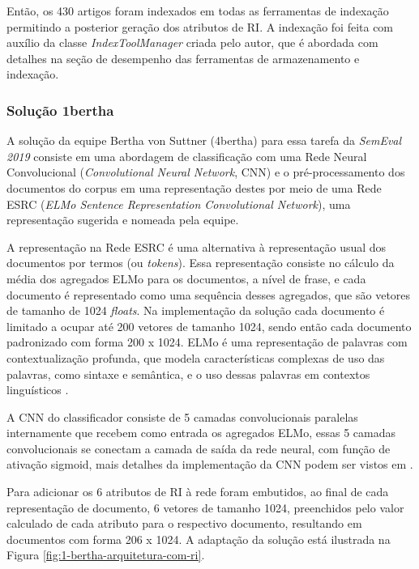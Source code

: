 			Então, os 430 artigos foram indexados em todas as ferramentas de indexação permitindo a posterior geração dos atributos de RI.
			A indexação foi feita com auxílio da classe \textit{IndexToolManager} criada pelo autor, que é abordada com detalhes na seção de desempenho das ferramentas de armazenamento e indexação.
			
			\subsubsection{Solução 1\underscore{}bertha}
				A solução da equipe Bertha von Suttner (4\underscore{}bertha) para essa tarefa da \textit{SemEval 2019} consiste em uma abordagem de classificação com uma Rede Neural Convolucional (\textit{Convolutional Neural Network}, CNN) e o pré-processamento dos documentos do corpus em uma representação destes por meio de uma Rede ESRC (\textit{ELMo Sentence Representation Convolutional Network}), uma representação sugerida e nomeada pela equipe.

				A representação na Rede ESRC é uma alternativa à representação usual dos documentos por termos (ou \textit{tokens}).
				Essa representação consiste no cálculo da média dos agregados ELMo para os documentos, a nível de frase, e cada documento é representado como uma sequência desses agregados, que são vetores de tamanho de 1024 \textit{floats}. 
				Na implementação da solução cada documento é limitado a ocupar até 200 vetores de tamanho 1024, sendo então cada documento padronizado com forma 200 x 1024.
				ELMo é uma representação de palavras com contextualização profunda, que modela características complexas de uso das palavras, como sintaxe e semântica, e o uso dessas palavras em contextos linguísticos \cite{ELMoDBLP:journals/corr/abs-1802-05365}.

				A CNN do classificador consiste de 5 camadas convolucionais paralelas internamente que recebem como entrada os agregados ELMo, essas 5 camadas convolucionais se conectam a camada de saída da rede neural, com função de ativação sigmoid, mais detalhes da implementação da CNN podem ser vistos em .

				Para adicionar os 6 atributos de RI à rede foram embutidos, ao final de cada representação de documento, 6 vetores de tamanho 1024, preenchidos pelo valor calculado de cada atributo para o respectivo documento, resultando em documentos com forma 206 x 1024.
				A adaptação da solução está ilustrada na Figura \ref{fig:1-bertha-arquitetura-com-ri}.
				
